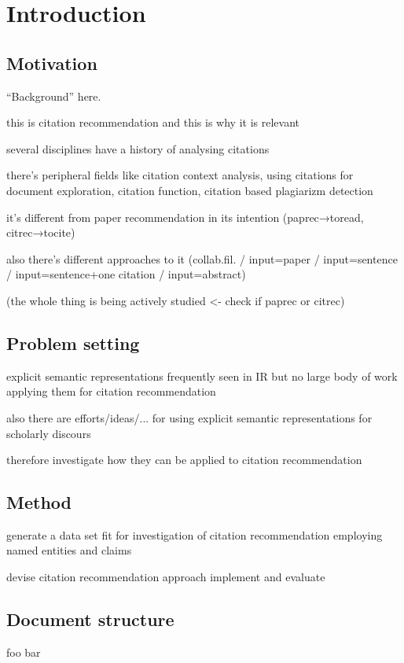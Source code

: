 \chapter{Introduction}\label{chap:introduction}
\section{Motivation}
``Background'' here.

this is citation recommendation and this is why it is relevant

several disciplines have a history of analysing citations\cite{White2004}

there's peripheral fields like citation context analysis\cite{HERNANDEZ-ALVAREZ2016}, using citations for document exploration\cite{Berger2016}, citation function\cite{Moravcsik1975,Abujbara2013,Teufel2006a,Teufel2006b}, citation based plagiarizm detection\cite{Gipp2010}

it’s different from paper recommendation in its intention (paprec→toread, citrec→tocite)

also there’s different approaches to it (collab.fil. / input=paper / input=sentence / input=sentence+one citation\cite{Kobayashi2018} / input=abstract\cite{Ayala-Gomez2018})

(the whole thing is being actively studied\cite{Beel2016} <- check if paprec or citrec)

\section{Problem setting}\label{sec:problemsetting}
explicit semantic representations frequently seen in IR but no large body of work applying them for citation recommendation

also there are efforts/ideas/... for using explicit semantic representations for scholarly discours\cite{BuckinghamShum2000,Kitamoto2016}

therefore investigate how they can be applied to citation recommendation

\section{Method}\label{sec:method}
generate a data set fit for investigation of citation recommendation employing named entities and claims

devise citation recommendation approach implement and evaluate

\section{Document structure}\label{sec:documentstructure}
foo bar

